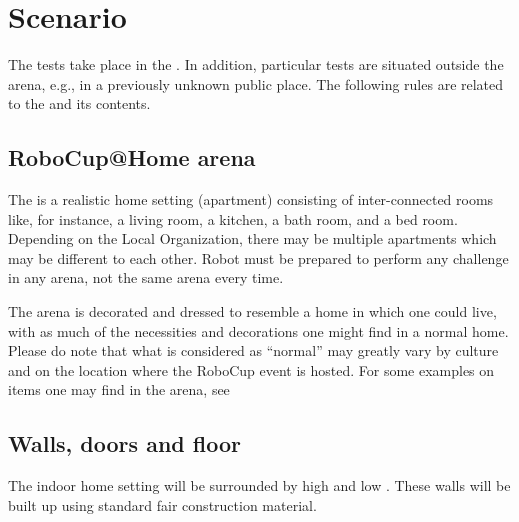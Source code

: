 \section{Scenario}
\label{sec:scenario}

The tests take place in the . In addition, particular tests are situated outside the arena, e.g., in a previously unknown public place. The following rules are related to the  and its contents. 

\subsection{RoboCup@Home arena}
The  is a realistic home setting (apartment) consisting of inter-connected rooms like, for instance, a living room, a kitchen, a bath room, and a bed room. 
Depending on the Local Organization, there may be multiple apartments which may be different to each other.
Robot must be prepared to perform any challenge in any arena, not the same arena every time. 

The arena is decorated and dressed to resemble a home in which one could live, with as much of the necessities and decorations one might find in a normal home. 
Please do note that what is considered as ``normal'' may greatly vary by culture and on the location where the RoboCup event is hosted. 
For some examples on items one may find in the arena, see 



\subsection{Walls, doors and floor}
\label{rule:scenario_walls}

The indoor home setting will be surrounded by high and low . These walls will be built up using standard fair construction material.


